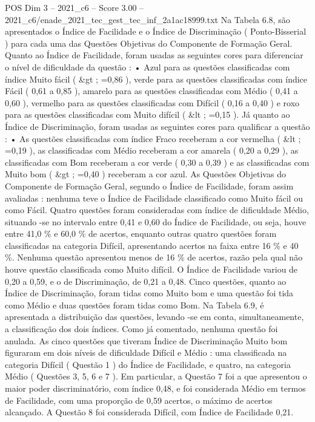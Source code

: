 \begin{textsample}{POS Dim 3 – 2021\_c6 – Score 3.00 – 2021\_c6/enade\_2021\_tec\_gest\_tec\_inf\_2a1ac18999.txt}
Na Tabela 6.8, são apresentados o Índice de Facilidade e o Índice de Discriminação ( Ponto-Bisserial ) para cada uma das Questões Objetivas do Componente de Formação Geral.
Quanto ao Índice de Facilidade, foram usadas as seguintes cores para diferenciar o nível de dificuldade da questão : • Azul para as questões classificadas com índice Muito fácil ( \&gt ; =0,86 ), verde para as questões classificadas com índice Fácil ( 0,61 a 0,85 ), amarelo para as questões classificadas com Médio ( 0,41 a 0,60 ), vermelho para as questões classificadas com Difícil ( 0,16 a 0,40 ) e roxo para as questões classificadas com Muito difícil ( \&lt ; =0,15 ).
Já quanto ao Índice de Discriminação, foram usadas as seguintes cores para qualificar a questão : • As questões classificadas com índice Fraco receberam a cor vermelha ( \&lt ; =0,19 ), as classificadas com Médio receberam a cor amarela ( 0,20 a 0,29 ), as classificadas com Bom receberam a cor verde ( 0,30 a 0,39 ) e as classificadas com Muito bom ( \&gt ; =0,40 ) receberam a cor azul.
As Questões Objetivas do Componente de Formação Geral, segundo o Índice de Facilidade, foram assim avaliadas : nenhuma teve o Índice de Facilidade classificado como Muito fácil ou como Fácil.
Quatro questões foram consideradas com índice de dificuldade Médio, situando -se no intervalo entre 0,41 e 0,60 do Índice de Facilidade, ou seja, houve entre 41,0 \% e 60,0 \% de acertos, enquanto outras quatro questões foram classificadas na categoria Difícil, apresentando acertos na faixa entre 16 \% e 40 \%.
Nenhuma questão apresentou menos de 16 \% de acertos, razão pela qual não houve questão classificada como Muito difícil.
O Índice de Facilidade variou de 0,20 a 0,59, e o de Discriminação, de 0,21 a 0,48.
Cinco questões, quanto ao Índice de Discriminação, foram tidas como Muito bom e uma questão foi tida como Médio e duas questões foram tidas como Bom.
Na Tabela 6.9, é apresentada a distribuição das questões, levando -se em conta, simultaneamente, a classificação dos dois índices.
Como já comentado, nenhuma questão foi anulada.
As cinco questões que tiveram Índice de Discriminação Muito bom figuraram em dois níveis de dificuldade Difícil e Médio : uma classificada na categoria Difícil ( Questão 1 ) do Índice de Facilidade, e quatro, na categoria Médio ( Questões 3, 5, 6 e 7 ).
Em particular, a Questão 7 foi a que apresentou o maior poder discriminatório, com índice 0,48, e foi considerada Médio em termos de Facilidade, com uma proporção de 0,59 acertos, o máximo de acertos alcançado.
A Questão 8 foi considerada Difícil, com Índice de Facilidade 0,21.

\end{textsample}
